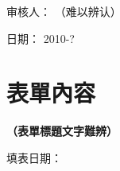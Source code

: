 \documentclass[UTF8,10pt,a4paper,fontset=fandol]{ctexart}
\newcommand{\fieldvalue}[1]{#1}
\newcommand{\handwritten}[1]{#1}
\begin{document}
\noindent
审核人：%
\fieldvalue{\handwritten{（难以辨认）}}

\noindent
日期：%
\fieldvalue{\handwritten{2010-?}}


\newpage

\section*{表單內容}


\begin{center}
\textbf{（表單標題文字難辨）}
\end{center}

\noindent
填表日期：
\fieldvalue{\handwritten{}}

\vspace{0.5em}
\end{document}
